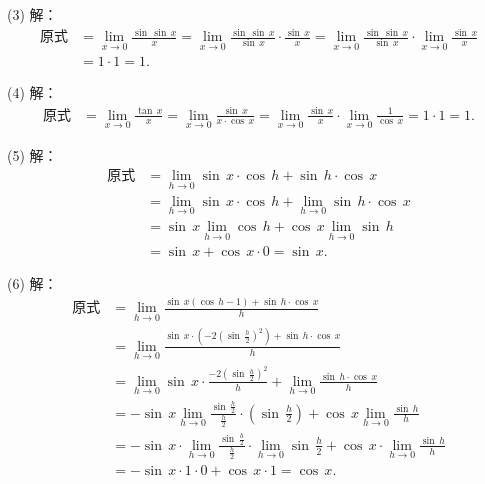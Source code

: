(3) 解：
\begin{align}
    \text{原式} &= \lim_{x \to 0} \frac{\sin \, \sin \, x}{x} = \lim_{x \to 0} \frac{\sin \, \sin \, x}{\sin \, x} \cdot \frac{\sin \, x}{x} = \lim_{x \to 0} \frac{\sin \, \sin \, x}{\sin \, x} \cdot \lim_{x \to 0} \frac{\sin \, x}{x} \\
    &= 1 \cdot 1 = 1.
\end{align}

(4) 解：
\begin{align}
    \text{原式} &= \lim_{x \to 0} \frac{\tan \, x}{x} = \lim_{x \to 0} \frac{\sin \, x}{x \cdot \cos \, x} = \lim_{x \to 0} \frac{\sin \, x}{x} \cdot \lim_{x \to 0} \frac{1}{\cos \, x} = 1 \cdot 1 = 1.
\end{align}

(5) 解：
\begin{align}
    \text{原式} &= \lim_{h \to 0} \sin \, x \cdot \cos \, h + \sin \, h \cdot \cos \, x \\
    &= \lim_{h \to 0} \sin \, x \cdot \cos \, h + \lim_{h \to 0} \sin \, h \cdot \cos \, x \\
    &= \sin \, x \lim_{h \to 0} \cos \, h + \cos \, x \lim_{h \to 0} \sin \, h \\
    &= \sin \, x + \cos \, x \cdot 0 = \sin \, x.
\end{align}

(6) 解：
\begin{align}
    \text{原式} &= \lim_{h \to 0} \frac{\sin \, x \left(\cos \, h - 1\right) + \sin \, h \cdot \cos \, x}{h} \\
    &= \lim_{h \to 0} \frac{\sin \, x \cdot \left(-2 (\sin \, \displaystyle\frac{h}{2} )^2 \right) + \sin \, h \cdot \cos \, x}{h} \\
    &= \lim_{h \to 0} \sin \, x \cdot \frac{-2 \left(\sin \, \displaystyle\frac{h}{2}\right)^2}{h} + \lim_{h \to 0} \frac{\sin \, h \cdot \cos \, x}{h} \\
    &= - \sin \, x \lim_{h \to 0} \frac{\sin \, \displaystyle\frac{h}{2}}{\displaystyle\frac{h}{2}} \cdot \left(\sin \, \displaystyle\frac{h}{2}\right) + \cos \, x \lim_{h \to 0} \frac{\sin \, h}{h} \\
    &= - \sin \, x \cdot \lim_{h \to 0} \displaystyle\frac{\sin \, \displaystyle\frac{h}{2}}{\displaystyle\frac{h}{2}} \cdot \lim_{h \to 0} \sin \, \displaystyle\frac{h}{2} + \cos \, x \cdot \lim_{h \to 0} \displaystyle\frac{\sin \, h}{h} \\
    &= - \sin \, x \cdot 1 \cdot 0 + \cos \, x \cdot 1 = \cos \, x.
\end{align}

